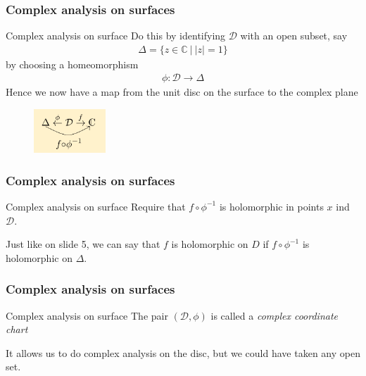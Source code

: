 \documentclass{beamer}[10]
\begin{document}
\begin{frame}
	\frametitle{Complex analysis on surfaces}
	\begin{block}{Complex analysis on surface}
			Do this by identifying $\mathcal{D}$ with an open subset, say
			\begin{equation}
				\begin{aligned}
					\Delta = \{z\in \mathds{C}~\big|~|z|=1\}
				\end{aligned}
			\end{equation}
		by choosing a homeomorphism 
		\begin{equation}
			\begin{aligned}
				\phi:\mathcal{D}\to \Delta
			\end{aligned}
		\end{equation}
	Hence we now have a map from the unit disc on the surface to the complex plane
\begin{figure}\vspace*{-0.3cm}
	\includegraphics[width=2.7cm]{3}
\end{figure}
	\end{block}
\end{frame}

\begin{frame}
	\frametitle{Complex analysis on surfaces}
	\begin{block}{Complex analysis on surface}
	Require that $f\circ \phi^{-1}$ is holomorphic in points $x$ ind $\mathcal{D}$.
	
	Just like on slide 5, we can say that $f$ is holomorphic on $D$ if $f\circ \phi^{-1}$ is holomorphic on $\Delta$. 
	
	\end{block}
\end{frame}

\begin{frame}
	\frametitle{Complex analysis on surfaces}
	\begin{block}{Complex analysis on surface}
	The pair $(\mathcal{D},\phi)$ is called a \textit{complex coordinate chart}
	
	It allows us to do complex analysis on the disc, but we could have taken any open set.
	\end{block}
\end{frame}
\end{document}
